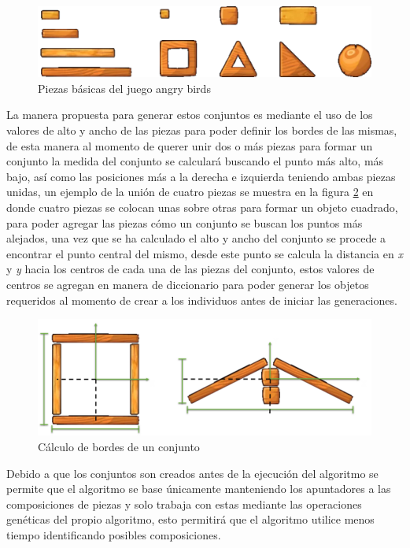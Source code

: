 \begin{figure}
  \centering
  \includegraphics[width=1.0\textwidth]{img/list_pieces.png}
  \caption{Piezas básicas del juego angry birds}
  \label{figure:game-basic-blocks}
\end{figure}

La manera propuesta para generar estos conjuntos es mediante el uso de los
valores de alto y ancho de las piezas para poder definir los bordes de las
mismas, de esta manera al momento de querer unir dos o más piezas para formar un
conjunto la medida del conjunto se calculará buscando el punto más alto, más
bajo, así como las posiciones más a la derecha e izquierda teniendo ambas piezas
unidas, un ejemplo de la unión de cuatro piezas se muestra en la figura
\ref{figure:bounding-box-calculation} en donde cuatro piezas se colocan unas
sobre otras para formar un objeto cuadrado, para poder agregar las piezas cómo
un conjunto se buscan los puntos más alejados, una vez que se ha calculado el
alto y ancho del conjunto se procede a encontrar el punto central del mismo,
desde este punto se calcula la distancia en \textit{x} y \textit{y} hacia los
centros de cada una de las piezas del conjunto, estos valores de centros se
agregan en manera de diccionario para poder generar los objetos requeridos al
momento de crear a los individuos antes de iniciar las generaciones.

\begin{figure}
  \centering
  \includegraphics[width=1.0\textwidth]{img/bounding_box_calculation.png}
  \caption{Cálculo de bordes de un conjunto}
  \label{figure:bounding-box-calculation}
\end{figure}

Debido a que los conjuntos son creados antes de la ejecución del algoritmo se
permite que el algoritmo se base únicamente manteniendo los apuntadores a las
composiciones de piezas y solo trabaja con estas mediante las operaciones
genéticas del propio algoritmo, esto permitirá que el algoritmo utilice menos
tiempo identificando posibles composiciones.

